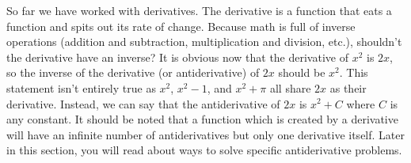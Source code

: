 \documentclass[../revisedmain.tex]{subfiles}
\begin{document}
So far we have worked with derivatives. The derivative is a function that eats a function and spits out its rate of change. Because math is full of inverse operations (addition and subtraction, multiplication and division, etc.), shouldn't the derivative have an inverse? It is obvious now that the derivative of $x^2$ is $2x$, so the inverse of the derivative (or antiderivative) of $2x$ should be $x^2$. This statement isn't entirely true as $x^2$, $x^2-1$, and $x^2+\pi$ all share $2x$ as their derivative. Instead, we can say that the antiderivative of $2x$ is $x^2+C$ where $C$ is any constant. It should be noted that a function which is created by a derivative will have an infinite number of antiderivatives but only one derivative itself. Later in this section, you will read about ways to solve specific antiderivative problems.
\end{document}
